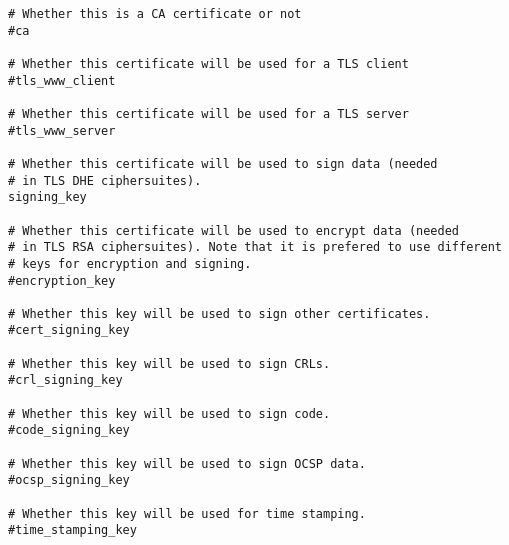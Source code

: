 \begin{verbatim}
# Whether this is a CA certificate or not
#ca

# Whether this certificate will be used for a TLS client
#tls_www_client

# Whether this certificate will be used for a TLS server
#tls_www_server

# Whether this certificate will be used to sign data (needed
# in TLS DHE ciphersuites).
signing_key

# Whether this certificate will be used to encrypt data (needed
# in TLS RSA ciphersuites). Note that it is prefered to use different
# keys for encryption and signing.
#encryption_key

# Whether this key will be used to sign other certificates.
#cert_signing_key

# Whether this key will be used to sign CRLs.
#crl_signing_key

# Whether this key will be used to sign code.
#code_signing_key

# Whether this key will be used to sign OCSP data.
#ocsp_signing_key

# Whether this key will be used for time stamping.
#time_stamping_key
\end{verbatim}
